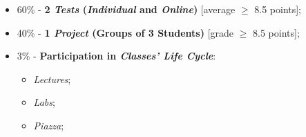 \begin{itemize}
    \vspace{-0.2cm}
    \item 60\% - \textbf{2 \emph{Tests} (\emph{Individual} and \emph{Online})} [average $\geq$ 8.5 points];
    \vspace{-0.1cm}
    \item 40\% - \textbf{1 \emph{Project} (Groups of 3 Students)} [grade $\geq$ 8.5 points];
    \vspace{-0.1cm}
    \item 3\% - \textbf{Participation in \emph{Classes' Life Cycle}}:
    \begin{itemize}
        \vspace{-0.2cm}
        \item \emph{Lectures};
        \vspace{-0.1cm}
        \item \emph{Labs};
        \vspace{-0.1cm}
        \item \emph{Piazza};
    \end{itemize}
\end{itemize}

\clearpage
